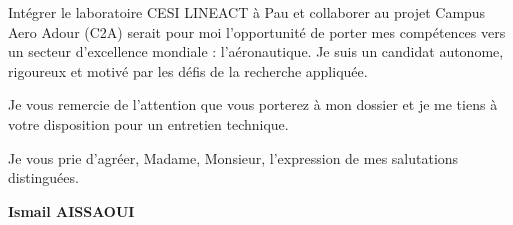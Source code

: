 \documentclass[a4paper,12pt]{article}
\begin{document}
Intégrer le laboratoire CESI LINEACT à Pau et collaborer au projet Campus Aero Adour (C2A) serait pour moi l'opportunité de porter mes compétences vers un secteur d'excellence mondiale : l'aéronautique. Je suis un candidat autonome, rigoureux et motivé par les défis de la recherche appliquée.

Je vous remercie de l'attention que vous porterez à mon dossier et je me tiens à votre disposition pour un entretien technique.

Je vous prie d'agréer, Madame, Monsieur, l'expression de mes salutations distinguées.

\bigskip

\begin{flushright}
    \textbf{Ismail AISSAOUI}
\end{flushright}
\end{document}
